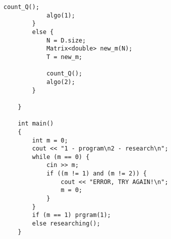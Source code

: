 \begin{lstlisting}[label = list1, caption = Программная реализация алгоритма и всех вспомогательных функций]
			count_Q();
			algo(1);
		} 
		else {
			N = D.size;
			Matrix<double> new_m(N);
			T = new_m;
			
			count_Q();
			algo(2);
		}
		
	}
	
	int main()
	{
		int m = 0;
		cout << "1 - program\n2 - research\n";
		while (m == 0) {
			cin >> m;
			if ((m != 1) and (m != 2)) {
				cout << "ERROR, TRY AGAIN!\n";
				m = 0;
			}
		}
		if (m == 1) prgram(1);
		else researching();
	}
\end{lstlisting}

\clearpage
